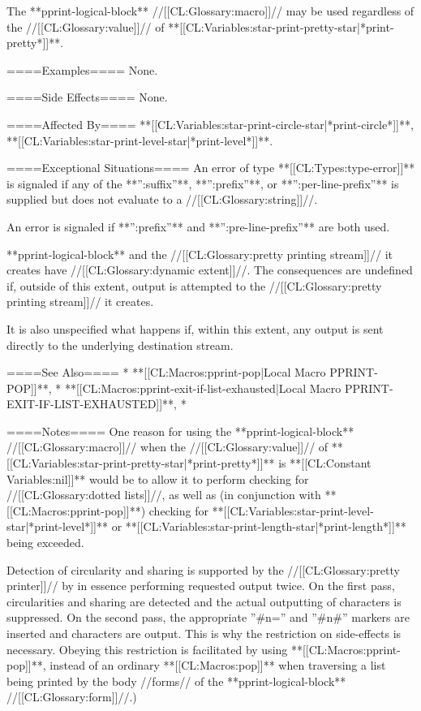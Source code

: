 The **pprint-logical-block** //[[CL:Glossary:macro]]// may be used regardless of the //[[CL:Glossary:value]]// of **[[CL:Variables:star-print-pretty-star|*print-pretty*]]**.

====Examples====
None.

====Side Effects====
None.

====Affected By====
**[[CL:Variables:star-print-circle-star|*print-circle*]]**, **[[CL:Variables:star-print-level-star|*print-level*]]**.

====Exceptional Situations====
An error of type **[[CL:Types:type-error]]** is signaled if any of the **'':suffix''**, **'':prefix''**, or **'':per-line-prefix''** is supplied but does not evaluate to a //[[CL:Glossary:string]]//.

An error is signaled if **'':prefix''** and **'':pre-line-prefix''** are both used.

**pprint-logical-block** and the //[[CL:Glossary:pretty printing stream]]// it creates have //[[CL:Glossary:dynamic extent]]//. The consequences are undefined if, outside of this extent, output is attempted to the //[[CL:Glossary:pretty printing stream]]// it creates.

It is also unspecified what happens if, within this extent, any output is sent directly to the underlying destination stream.

====See Also====
  * **[[CL:Macros:pprint-pop|Local Macro PPRINT-POP]]**,
  * **[[CL:Macros:pprint-exit-if-list-exhausted|Local Macro PPRINT-EXIT-IF-LIST-EXHAUSTED]]**,
  * {\secref\TildeLessThanLogicalBlock}

====Notes====
One reason for using the **pprint-logical-block** //[[CL:Glossary:macro]]// when the //[[CL:Glossary:value]]// of **[[CL:Variables:star-print-pretty-star|*print-pretty*]]** is **[[CL:Constant Variables:nil]]** would be to allow it to perform checking for //[[CL:Glossary:dotted lists]]//, as well as (in conjunction with **[[CL:Macros:pprint-pop]]**) checking for **[[CL:Variables:star-print-level-star|*print-level*]]** or **[[CL:Variables:star-print-length-star|*print-length*]]** being exceeded.

Detection of circularity and sharing is supported by the //[[CL:Glossary:pretty printer]]// by in essence performing requested output twice. On the first pass, circularities and sharing are detected and the actual outputting of characters is suppressed. On the second pass, the appropriate ''#n='' and ''#n#'' markers are inserted and characters are output. This is why the restriction on side-effects is necessary. Obeying this restriction is facilitated by using **[[CL:Macros:pprint-pop]]**, instead of an ordinary **[[CL:Macros:pop]]** when traversing a list being printed by the body //forms// of the **pprint-logical-block** //[[CL:Glossary:form]]//.)

    
